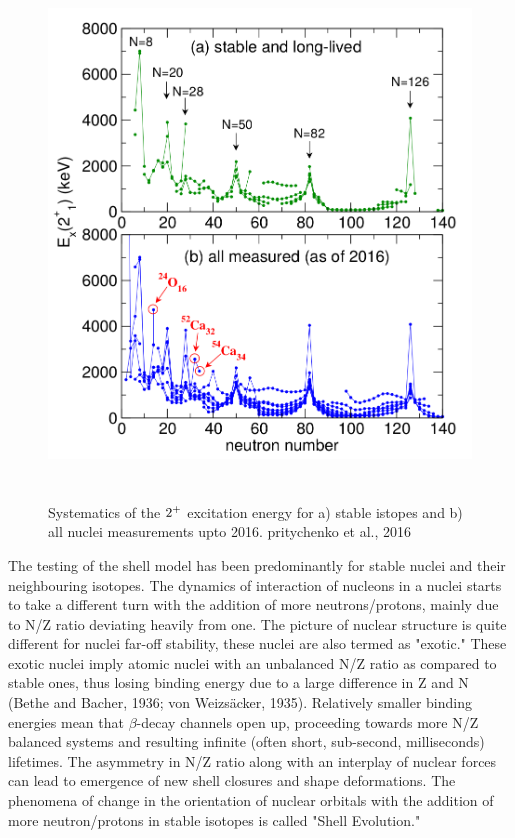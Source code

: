 \begin{figure}[h!]
	\centering
	\includegraphics[width=14cm,height=14cm]{figures/be2_n_50.png}
	\caption[Systematics of the $2\textsuperscript{+}$ excitation energy  ]{Systematics of the $2\textsuperscript{+}$ excitation energy for a) stable istopes and b) all nuclei measurements upto 2016. pritychenko et al., 2016 }
	\label{fig:2_plus_excitation}
\end{figure}

The testing of the shell model has been predominantly for stable nuclei and their neighbouring isotopes. The dynamics of interaction of nucleons in a nuclei starts to take a different turn with the addition of more neutrons/protons, mainly due to N/Z ratio deviating heavily from one. The picture of nuclear structure is quite different for nuclei far-off stability, these nuclei are also termed as "exotic." These exotic nuclei imply atomic nuclei with an unbalanced N/Z ratio as compared to stable ones, thus losing binding energy due to a large difference in Z and N (Bethe and Bacher, 1936; von Weizsäcker, 1935). Relatively smaller binding energies mean that $\beta$-decay channels open up, proceeding towards more N/Z balanced systems and resulting infinite (often short, sub-second, milliseconds) lifetimes. The asymmetry in N/Z ratio along with an interplay of nuclear forces can lead to emergence of new shell closures and shape deformations. The phenomena of change in the orientation of nuclear orbitals with the addition of more neutron/protons in stable isotopes is called "Shell Evolution." 

